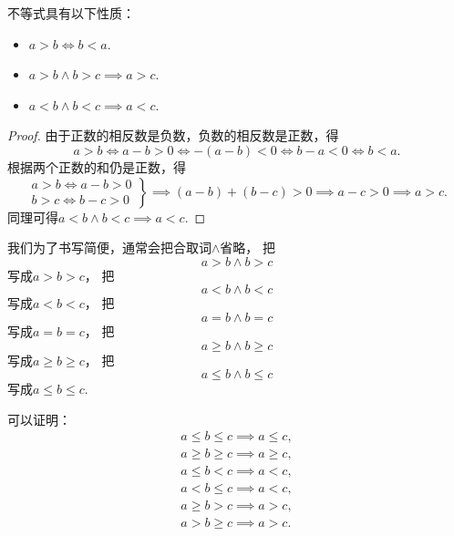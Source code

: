 \begin{property}\label{theorem:不等式.不等式的对称性和传递性}
不等式具有以下性质：\begin{itemize}
	\item \(a>b \iff b<a\).
	\item \(a>b \land b>c \implies a>c\).
	\item \(a<b \land b<c \implies a<c\).
\end{itemize}
\begin{proof}
由于正数的相反数是负数，负数的相反数是正数，得\begin{equation*}
	a > b \iff a-b > 0 \iff -(a-b) < 0 \iff b-a < 0 \iff b < a.
\end{equation*}
根据两个正数的和仍是正数，得\begin{equation*}
	\left. \begin{array}{c}
		a > b \iff a-b > 0 \\
		b > c \iff b-c > 0
	\end{array} \right\}
	\implies (a-b)+(b-c) > 0
	\implies a-c > 0
	\implies a > c.
\end{equation*}
同理可得\(a<b \land b<c \implies a<c\).
\end{proof}
\end{property}
我们为了书写简便，通常会把合取词\(\land\)省略，
把\begin{equation*}
	a>b \land b>c
\end{equation*}写成\(a>b>c\)，
把\begin{equation*}
	a<b \land b<c
\end{equation*}写成\(a<b<c\)，
把\begin{equation*}
	a=b \land b=c
\end{equation*}写成\(a=b=c\)，
把\begin{equation*}
	a \geq b \land b \geq c
\end{equation*}写成\(a \geq b \geq c\)，
把\begin{equation*}
	a \leq b \land b \leq c
\end{equation*}写成\(a \leq b \leq c\).

可以证明：\begin{gather*}
	a \leq b \leq c \implies a \leq c, \\
	a \geq b \geq c \implies a \geq c, \\
	a \leq b < c \implies a < c, \\
	a < b \leq c \implies a < c, \\
	a \geq b > c \implies a > c, \\
	a > b \geq c \implies a > c.
\end{gather*}

